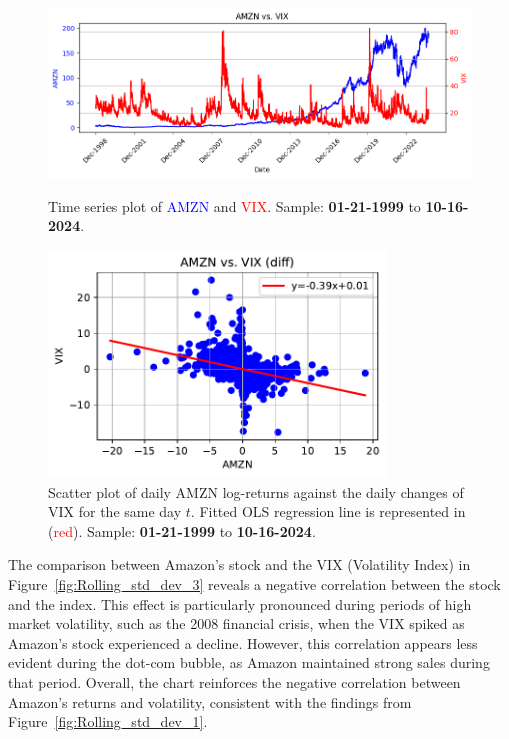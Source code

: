 \documentclass{article}
\begin{document}
\begin{figure}[H]
    \begin{minipage}{0.46\textwidth}
        \centering
        \includegraphics[width=1\textwidth]{Img/Fact8.pdf}
        \caption{Time series plot of \textcolor{blue}{AMZN} and \textcolor{red}{VIX}. Sample: \textbf{01-21-1999} to \textbf{10-16-2024}.}
        \label{fig:Rolling_std_dev_3}
    \end{minipage}
    \centering
    \hspace{0.01\textwidth}
    \begin{minipage}{0.46\textwidth}
        \centering
        \includegraphics[width=0.8\textwidth]{Img/Fact_8_3AMZN_.pdf}
        \caption{Scatter plot of daily AMZN log-returns against the daily changes of VIX for the same day $t$. 
        Fitted OLS regression line is represented in (\textcolor{red}{red}).
        Sample: \textbf{01-21-1999} to \textbf{10-16-2024}.}
        \label{fig:Rolling_std_dev}
    \end{minipage}
\end{figure}

\noindent The comparison between Amazon's stock and the VIX (Volatility Index) in Figure~\ref{fig:Rolling_std_dev_3} reveals a negative correlation between the stock and the index. This effect is particularly pronounced during periods of high market volatility, such as the 2008 financial crisis, when the VIX spiked as Amazon's stock experienced a decline. However, this correlation appears less evident during the dot-com bubble, as Amazon maintained strong sales during that period. Overall, the chart reinforces the negative correlation between Amazon’s returns and volatility, consistent with the findings from Figure~\ref{fig:Rolling_std_dev_1}.
\end{document}

